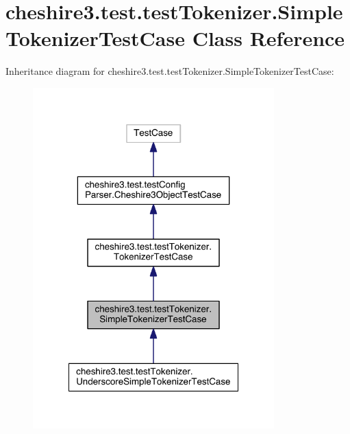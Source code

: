 \hypertarget{classcheshire3_1_1test_1_1test_tokenizer_1_1_simple_tokenizer_test_case}{\section{cheshire3.\-test.\-test\-Tokenizer.\-Simple\-Tokenizer\-Test\-Case Class Reference}
\label{classcheshire3_1_1test_1_1test_tokenizer_1_1_simple_tokenizer_test_case}
}


Inheritance diagram for cheshire3.\-test.\-test\-Tokenizer.\-Simple\-Tokenizer\-Test\-Case\-:
\nopagebreak
\begin{figure}[H]
\begin{center}
\leavevmode
\includegraphics[width=264pt]{classcheshire3_1_1test_1_1test_tokenizer_1_1_simple_tokenizer_test_case__inherit__graph}
\end{center}
\end{figure}



